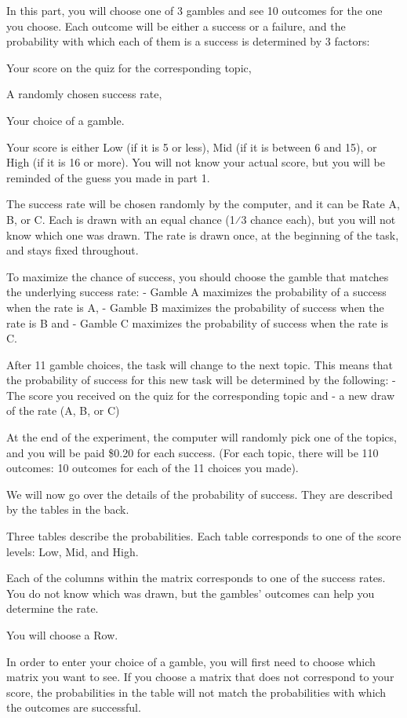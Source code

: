 \documentclass[
  12pt,
]{article}
\begin{document}
In this part, you will choose one of 3 gambles and see 10 outcomes for
the one you choose. Each outcome will be either a success or a failure,
and the probability with which each of them is a success is determined
by 3 factors:

Your score on the quiz for the corresponding topic,

A randomly chosen success rate,

Your choice of a gamble.

Your score is either Low (if it is 5 or less), Mid (if it is between 6
and 15), or High (if it is 16 or more). You will not know your actual
score, but you will be reminded of the guess you made in part 1.

The success rate will be chosen randomly by the computer, and it can be
Rate A, B, or C. Each is drawn with an equal chance (1⁄3 chance each),
but you will not know which one was drawn. The rate is drawn once, at
the beginning of the task, and stays fixed throughout.

To maximize the chance of success, you should choose the gamble that
matches the underlying success rate: - Gamble A maximizes the
probability of a success when the rate is A, - Gamble B maximizes the
probability of success when the rate is B and - Gamble C maximizes the
probability of success when the rate is C.

After 11 gamble choices, the task will change to the next topic. This
means that the probability of success for this new task will be
determined by the following: - The score you received on the quiz for
the corresponding topic and - a new draw of the rate (A, B, or C)

At the end of the experiment, the computer will randomly pick one of the
topics, and you will be paid \$0.20 for each success. (For each topic,
there will be 110 outcomes: 10 outcomes for each of the 11 choices you
made).

We will now go over the details of the probability of success. They are
described by the tables in the back.

Three tables describe the probabilities. Each table corresponds to one
of the score levels: Low, Mid, and High.

Each of the columns within the matrix corresponds to one of the success
rates. You do not know which was drawn, but the gambles' outcomes can
help you determine the rate.

You will choose a Row.

In order to enter your choice of a gamble, you will first need to choose
which matrix you want to see. If you choose a matrix that does not
correspond to your score, the probabilities in the table will not match
the probabilities with which the outcomes are successful.
\end{document}
